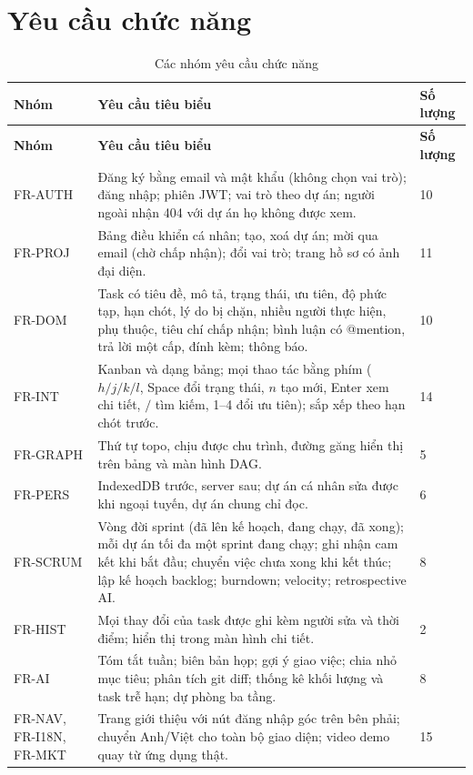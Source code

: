 \documentclass[../main.tex]{subfiles}
\begin{document}
\section{Yêu cầu chức năng}
\begin{longtable}{|p{2.3cm}|p{9.2cm}|p{2.0cm}|}
\caption{Các nhóm yêu cầu chức năng}\label{tab:fr}\\
\hline
\textbf{Nhóm} & \textbf{Yêu cầu tiêu biểu} & \textbf{Số lượng} \\ \hline
\endfirsthead
\hline
\textbf{Nhóm} & \textbf{Yêu cầu tiêu biểu} & \textbf{Số lượng} \\ \hline
\endhead
FR-AUTH & Đăng ký bằng email và mật khẩu (không chọn vai trò); đăng nhập; phiên JWT; vai trò theo dự án; người ngoài nhận 404 với dự án họ không được xem. & 10 \\ \hline
FR-PROJ & Bảng điều khiển cá nhân; tạo, xoá dự án; mời qua email (chờ chấp nhận); đổi vai trò; trang hồ sơ có ảnh đại diện. & 11 \\ \hline
FR-DOM & Task có tiêu đề, mô tả, trạng thái, ưu tiên, độ phức tạp, hạn chót, lý do bị chặn, nhiều người thực hiện, phụ thuộc, tiêu chí chấp nhận; bình luận có @mention, trả lời một cấp, đính kèm; thông báo. & 10 \\ \hline
FR-INT & Kanban và dạng bảng; mọi thao tác bằng phím ($h/j/k/l$, Space đổi trạng thái, $n$ tạo mới, Enter xem chi tiết, $/$ tìm kiếm, 1--4 đổi ưu tiên); sắp xếp theo hạn chót trước. & 14 \\ \hline
FR-GRAPH & Thứ tự topo, chịu được chu trình, đường găng hiển thị trên bảng và màn hình DAG. & 5 \\ \hline
FR-PERS & IndexedDB trước, server sau; dự án cá nhân sửa được khi ngoại tuyến, dự án chung chỉ đọc. & 6 \\ \hline
FR-SCRUM & Vòng đời sprint (đã lên kế hoạch, đang chạy, đã xong); mỗi dự án tối đa một sprint đang chạy; ghi nhận cam kết khi bắt đầu; chuyển việc chưa xong khi kết thúc; lập kế hoạch backlog; burndown; velocity; retrospective AI. & 8 \\ \hline
FR-HIST & Mọi thay đổi của task được ghi kèm người sửa và thời điểm; hiển thị trong màn hình chi tiết. & 2 \\ \hline
FR-AI & Tóm tắt tuần; biên bản họp; gợi ý giao việc; chia nhỏ mục tiêu; phân tích git diff; thống kê khối lượng và task trễ hạn; dự phòng ba tầng. & 8 \\ \hline
FR-NAV, FR-I18N, FR-MKT & Trang giới thiệu với nút đăng nhập góc trên bên phải; chuyển Anh/Việt cho toàn bộ giao diện; video demo quay từ ứng dụng thật. & 15 \\ \hline
\end{longtable}
\end{document}
